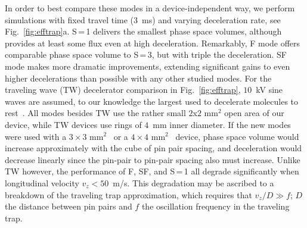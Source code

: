 \documentclass[%
 reprint,
 amsmath,amssymb,
 aps,
prl,
]{revtex4-1}
\begin{document}
In order to best compare these modes in a device-independent way, we perform simulations with fixed travel time ($3$~ms) and varying deceleration rate, see Fig.~\ref{fig:efftrap}a.
S\,=\,1 delivers the smallest phase space volumes, although provides at least some flux even at high deceleration.
Remarkably, F mode offers comparable phase space volume to S\,=\,3, but with triple the deceleration.
SF mode makes more dramatic improvements, extending significant gains to even higher decelerations than possible with any other studied modes.
For the traveling wave (TW) decelerator comparison in Fig.~\ref{fig:efftrap}, $10$~kV sine waves are assumed, to our knowledge the largest used to decelerate molecules to rest~\cite{Quintero-Perez2013}.
All modes besides TW use the rather small $2$x$2\text{ mm}^2$ open area of our device, while TW devices use rings of $4$~mm inner diameter.
If the new modes were used with a $3\times3\text{ mm}^2$~\cite{Scharfenberg2009} or a $4\times4\text{ mm}^2$~\cite{VandeMeerakker2005} device, phase space volume would increase approximately with the cube of pin pair spacing, and deceleration would decrease linearly since the pin-pair to pin-pair spacing also must increase.
Unlike TW however, the performance of F, SF, and S\,=\,1 all degrade significantly when longitudinal velocity $v_z < 50$~m/s. 
This degradation may be ascribed to a breakdown of the traveling trap approximation, which requires that $v_z/D \gg f$; $D$ the distance between pin pairs and $f$ the oscillation frequency in the traveling trap.
\end{document}
